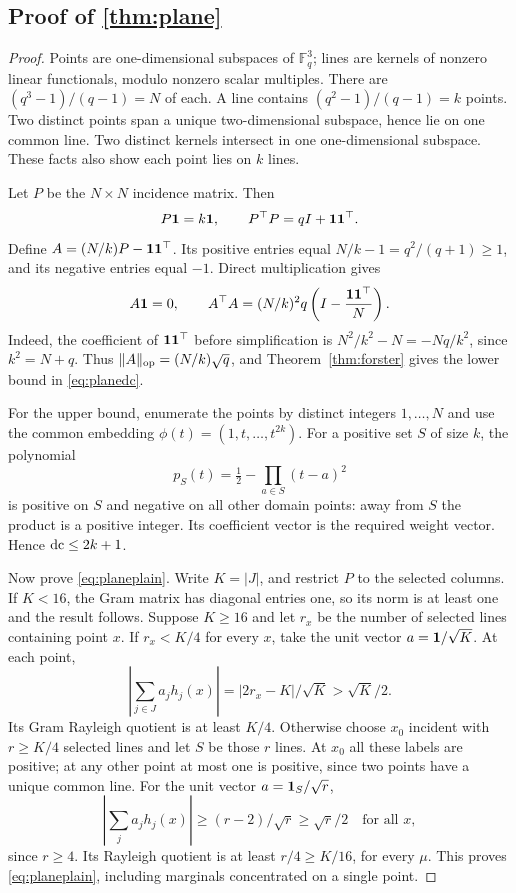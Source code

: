 \subsection[Proof of result plane]{Proof of \cref{thm:plane}}\label{proof:plane}
\begin{proof}
Points are one-dimensional subspaces of $\mathbb F_q^3$; lines are kernels of nonzero linear functionals, modulo nonzero scalar multiples. There are $(q^3-1)/(q-1)=N$ of each. A line contains $(q^2-1)/(q-1)=k$ points. Two distinct points span a unique two-dimensional subspace, hence lie on one common line. Two distinct kernels intersect in one one-dimensional subspace. These facts also show each point lies on $k$ lines.

Let $P$ be the $N\times N$ incidence matrix. Then
\[
 P\mathbf 1=k\mathbf 1,\qquad P^\top P=qI+\mathbf 1\mathbf 1^\top.
\]
Define $A=(N/k)P-\mathbf 1\mathbf 1^\top$. Its positive entries equal $N/k-1=q^2/(q+1)\geq1$, and its negative entries equal $-1$. Direct multiplication gives
\[
 A\mathbf 1=0,\qquad
 A^\top A=(N/k)^2q\left(I-\frac{\mathbf 1\mathbf 1^\top}{N}\right).
\]
Indeed, the coefficient of $\mathbf 1\mathbf 1^\top$ before simplification is $N^2/k^2-N=-Nq/k^2$, since $k^2=N+q$. Thus $\|A\|_{\mathrm{op}}=(N/k)\sqrt q$, and Theorem~\ref{thm:forster} gives the lower bound in \eqref{eq:planedc}.

For the upper bound, enumerate the points by distinct integers $1,\ldots,N$ and use the common embedding
$\phi(t)=(1,t,\ldots,t^{2k})$. For a positive set $S$ of size $k$, the polynomial
\[
 p_S(t)=\tfrac12-\prod_{a\in S}(t-a)^2
\]
is positive on $S$ and negative on all other domain points: away from $S$ the product is a positive integer. Its coefficient vector is the required weight vector. Hence $\operatorname{dc}\leq2k+1$.

Now prove \eqref{eq:planeplain}. Write $K=|J|$, and restrict $P$ to the selected columns. If $K<16$, the Gram matrix has diagonal entries one, so its norm is at least one and the result follows. Suppose $K\geq16$ and let $r_x$ be the number of selected lines containing point $x$.
If $r_x<K/4$ for every $x$, take the unit vector $a=\mathbf 1/\sqrt K$. At each point,
\[
 |\textstyle\sum_{j\in J}a_jh_j(x)|=|2r_x-K|/\sqrt K>\sqrt K/2.
\]
Its Gram Rayleigh quotient is at least $K/4$. Otherwise choose $x_0$ incident with $r\geq K/4$ selected lines and let $S$ be those $r$ lines. At $x_0$ all these labels are positive; at any other point at most one is positive, since two points have a unique common line. For the unit vector $a=\mathbf 1_S/\sqrt r$,
\[
 |\textstyle\sum_j a_jh_j(x)|\geq(r-2)/\sqrt r\geq\sqrt r/2
 \quad\text{for all }x,
\]
since $r\geq4$. Its Rayleigh quotient is at least $r/4\geq K/16$, for every $\mu$. This proves \eqref{eq:planeplain}, including marginals concentrated on a single point.


\end{proof}
